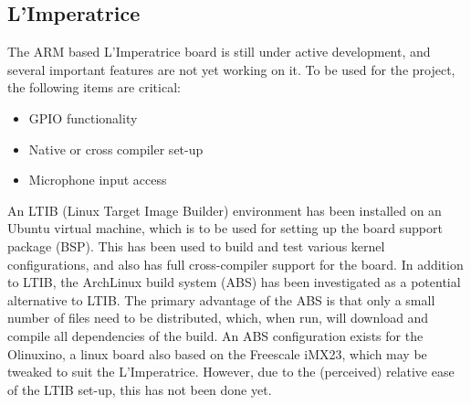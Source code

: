 \subsection{L'Imperatrice} %
\label{sub:l_imperatrice}
The ARM based L'Imperatrice board is still under active development, and several important features are not yet working on it.  To be used for the project, the following items are critical:
\begin{itemize}
	\item GPIO functionality
	\item Native or cross compiler set-up
	\item Microphone input access
\end{itemize}
An LTIB (Linux Target Image Builder) environment has been installed on an Ubuntu virtual machine, which is to be used for setting up the board support package (BSP).  This has been used to build and test various kernel configurations, and also has full cross-compiler support for the board.
In addition to LTIB, the ArchLinux build system (ABS) has been investigated as a potential alternative to LTIB.  The primary advantage of the ABS is that only a small number of files need to be distributed, which, when run, will download and compile all dependencies of the build.  An ABS configuration exists for the Olinuxino, a linux board also based on the Freescale iMX23, which may be tweaked to suit the L'Imperatrice.  However, due to the (perceived) relative ease of the LTIB set-up, this has not been done yet.



